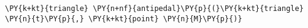 \begin{Verbatim}[commandchars=\\\{\}]
    \PY{k+kt}{triangle} \PY{n+nf}{antipedal}\PY{p}{(}\PY{k+kt}{triangle} \PY{n}{t}\PY{p}{,} \PY{k+kt}{point} \PY{n}{M}\PY{p}{)}
\end{Verbatim}
